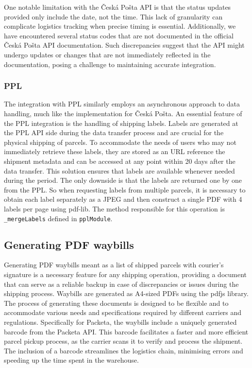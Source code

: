 One notable limitation with the Česká Pošta API is that the status updates provided only include the date, not the time. 
This lack of granularity can complicate logistics tracking when precise timing is essential.
Additionally, we have encountered several status codes that are not documented in the official Česká Pošta API documentation.
Such discrepancies suggest that the API might undergo updates or changes that are not immediately reflected in the documentation, posing a challenge to maintaining accurate integration.

\subsubsection{PPL}
The integration with PPL similarly employs an asynchronous approach to data handling, much like the implementation for Česká Pošta.
 An essential feature of the PPL integration is the handling of shipping labels. 
 Labels are generated at the PPL API side during the data transfer process and are crucial for the physical shipping of parcels. 
 To accommodate the needs of users who may not immediately retrieve these labels, they are stored as an URL reference the shipment metadata and can be accessed at any point within 20 days after the data transfer. 
 This solution ensures that labels are available whenever needed during the period.
 The only downside is that the labels are returned one by one from the PPL.
 So when requesting labels from multiple parcels, it is necessary to obtain each label separately as a JPEG and then construct a single PDF with 4 labels per page using \gls{pdf-lib}.
 The method responsible for this operation is \texttt{\_mergeLabels} defined in \texttt{pplModule}.

\subsection{Generating PDF waybills}
Generating PDF waybills meant as a list of shipped parcels with courier's signature is a necessary feature for any shipping operation, providing a document that can serve as a reliable backup in case of discrepancies or issues during the shipping process.
Waybills are generated as A4-sized PDFs using the \gls{pdfjs} library.
The process of generating these documents is designed to be flexible and to accommodate various needs and specifications required by different carriers and regulations. 
Specifically for Packeta, the waybills include a uniquely generated barcode from the Packeta API. 
This barcode facilitates a faster and more efficient parcel pickup process, as the carrier scans it to verify and process the shipment. 
The inclusion of a barcode streamlines the logistics chain, minimising errors and speeding up the time spent in the warehouse.

